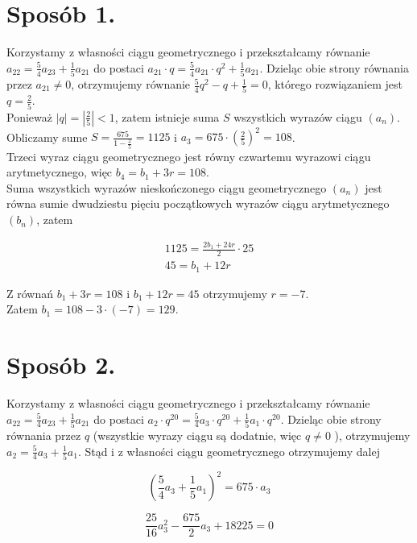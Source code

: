 \documentclass[10pt]{article}
\begin{document}
\section*{Sposób 1.}
Korzystamy z własności ciągu geometrycznego i przekształcamy równanie $a_{22}=\frac{5}{4} a_{23}+\frac{1}{5} a_{21}$ do postaci $a_{21} \cdot q=\frac{5}{4} a_{21} \cdot q^{2}+\frac{1}{5} a_{21}$. Dzieląc obie strony równania przez $a_{21} \neq 0$, otrzymujemy równanie $\frac{5}{4} q^{2}-q+\frac{1}{5}=0$, którego rozwiązaniem jest $q=\frac{2}{5}$.\\
Ponieważ $|q|=\left|\frac{2}{5}\right|<1$, zatem istnieje suma $S$ wszystkich wyrazów ciągu $\left(a_{n}\right)$.\\
Obliczamy sume $S=\frac{675}{1-\frac{2}{5}}=1125$ i $a_{3}=675 \cdot\left(\frac{2}{5}\right)^{2}=108$.\\
Trzeci wyraz ciągu geometrycznego jest równy czwartemu wyrazowi ciągu arytmetycznego, więc $b_{4}=b_{1}+3 r=108$.\\
Suma wszystkich wyrazów nieskończonego ciągu geometrycznego $\left(a_{n}\right)$ jest równa sumie dwudziestu pięciu początkowych wyrazów ciągu arytmetycznego $\left(b_{n}\right)$, zatem

$$
\begin{gathered}
1125=\frac{2 b_{1}+24 r}{2} \cdot 25 \\
45=b_{1}+12 r
\end{gathered}
$$

Z równań $b_{1}+3 r=108$ i $b_{1}+12 r=45$ otrzymujemy $r=-7$.\\
Zatem $b_{1}=108-3 \cdot(-7)=129$.

\section*{Sposób 2.}
Korzystamy z własności ciągu geometrycznego i przekształcamy równanie $a_{22}=\frac{5}{4} a_{23}+\frac{1}{5} a_{21}$ do postaci $a_{2} \cdot q^{20}=\frac{5}{4} a_{3} \cdot q^{20}+\frac{1}{5} a_{1} \cdot q^{20}$. Dzieląc obie strony równania przez $q$ (wszystkie wyrazy ciągu są dodatnie, więc $q \neq 0$ ), otrzymujemy $a_{2}=\frac{5}{4} a_{3}+\frac{1}{5} a_{1}$. Stąd i z własności ciągu geometrycznego otrzymujemy dalej

$$
\left(\frac{5}{4} a_{3}+\frac{1}{5} a_{1}\right)^{2}=675 \cdot a_{3}
$$

$$
\frac{25}{16} a_{3}^{2}-\frac{675}{2} a_{3}+18225=0
$$
\end{document}
